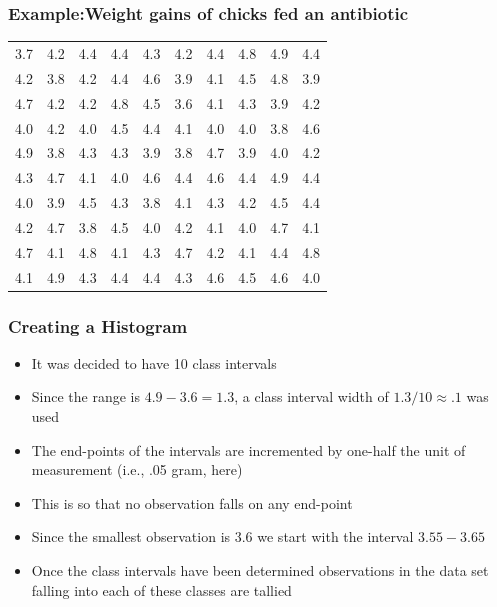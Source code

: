 \documentclass[xcolor=dvipsnames,12pt]{beamer}
\begin{document}
\begin{frame}
\frametitle{Example:Weight gains of chicks fed an antibiotic }
\begin{tabular}{rrrrrrrrrr}
\hline
3.7  & 4.2  & 4.4  & 4.4  & 4.3  & 4.2  & 4.4  & 4.8  & 4.9  & 4.4\\
4.2  & 3.8  & 4.2  & 4.4  & 4.6  & 3.9  & 4.1  & 4.5  & 4.8  & 3.9\\
4.7  & 4.2  & 4.2  & 4.8  & 4.5  & 3.6  & 4.1  & 4.3  & 3.9  & 4.2\\
4.0  & 4.2  & 4.0  & 4.5  & 4.4  & 4.1  & 4.0  & 4.0  & 3.8  & 4.6\\
4.9  & 3.8  & 4.3  & 4.3  & 3.9  & 3.8  & 4.7  & 3.9  & 4.0  & 4.2\\
4.3  & 4.7  & 4.1  & 4.0  & 4.6  & 4.4  & 4.6  & 4.4  & 4.9  & 4.4\\
4.0  & 3.9  & 4.5  & 4.3  & 3.8  & 4.1  & 4.3  & 4.2  & 4.5  & 4.4\\
4.2  & 4.7  & 3.8  & 4.5  & 4.0  & 4.2  & 4.1  & 4.0  & 4.7  & 4.1\\
4.7  & 4.1  & 4.8  & 4.1  & 4.3  & 4.7  & 4.2  & 4.1  & 4.4  & 4.8\\
4.1  & 4.9  & 4.3  & 4.4  & 4.4  & 4.3  & 4.6  & 4.5  & 4.6  & 4.0\\ \hline
\end{tabular}
\end{frame}


\begin{frame}
\frametitle{Creating a Histogram}
\begin{itemize}
\item It was decided to have 10 class intervals 
\item Since the range is $4.9-3.6=1.3$, a class interval width of $ 1.3/10  \approx .1 $ was used
\item The end-points of the intervals are incremented by one-half the unit of measurement (i.e., .05 gram, here)  
\item This is so that no observation falls on any
end-point
\item Since the smallest observation is 3.6 we start with the 
interval $3.55-3.65$ 
\item Once the class intervals have been determined
observations in the data set falling into each of these classes are 
tallied
\end{itemize}
\end{frame}
\end{document}
